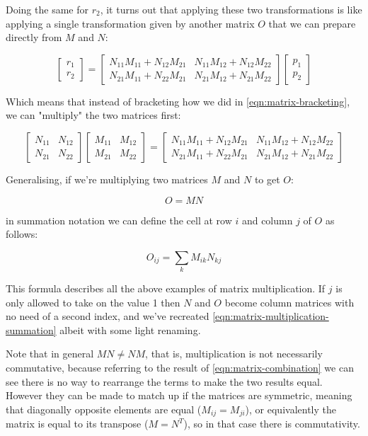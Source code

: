 Doing the same for $r_2$, it turns out that applying these two transformations is like applying a single transformation given by another matrix $O$ that we can prepare directly from $M$ and $N$:

$$
\begin{bmatrix}
r_1 \\
r_2
\end{bmatrix}
= 
\begin{bmatrix}
N_{11}M_{11} + N_{12}M_{21} & N_{11}M_{12} + N_{12}M_{22} \\
N_{21}M_{11} + N_{22}M_{21} & N_{21}M_{12} + N_{21}M_{22}
\end{bmatrix}
\begin{bmatrix}
p_1 \\
p_2
\end{bmatrix}
$$

Which means that instead of bracketing how we did in \eqref{eqn:matrix-bracketing}, we can "multiply" the two matrices first:

\begin{equation}
\begin{bmatrix}
N_{11} & N_{12} \\
N_{21} & N_{22}
\end{bmatrix}
\begin{bmatrix}
M_{11} & M_{12} \\
M_{21} & M_{22}
\end{bmatrix}
=
\begin{bmatrix}
N_{11}M_{11} + N_{12}M_{21} & N_{11}M_{12} + N_{12}M_{22} \\
N_{21}M_{11} + N_{22}M_{21} & N_{21}M_{12} + N_{21}M_{22}
\end{bmatrix}
\label{eqn:matrix-combination}
\end{equation}

Generalising, if we're multiplying two matrices $M$ and $N$ to get $O$:

$$O = MN$$

in summation notation we can define the cell at row $i$ and column $j$ of $O$ as follows:

$$O_{ij} = \sum_k M_{ik} N_{kj}$$

This formula describes all the above examples of matrix multiplication. If $j$ is only allowed to take on the value 1 then $N$ and $O$ become column matrices with no need of a second index, and we've recreated \eqref{eqn:matrix-multiplication-summation} albeit with some light renaming.

Note that in general $MN \ne NM$, that is, multiplication is not necessarily commutative, because referring to the result of \eqref{eqn:matrix-combination} we can see there is no way to rearrange the terms to make the two results equal. However they can be made to match up if the matrices are symmetric, meaning that diagonally opposite elements are equal ($M_{ij} = M_{ji}$), or equivalently the matrix is equal to its transpose ($M = N^T$), so in that case there is commutativity.

